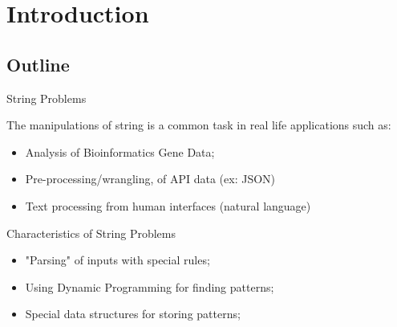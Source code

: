 \section{Introduction}

\subsection{Outline}

\begin{frame}{String Problems}
    \begin{exampleblock}{}
      The manipulations of string is a common task in real life applications such as:

      \begin{itemize}
        \item Analysis of Bioinformatics Gene Data;
        \item Pre-processing/wrangling, of API data (ex: JSON)
        \item Text processing from human interfaces (natural language)
      \end{itemize}
    \end{exampleblock}

    \begin{block}{Characteristics of String Problems}
      \begin{itemize}
      \item "Parsing" of inputs with special rules;
      \item Using Dynamic Programming for finding patterns;
      \item Special data structures for storing patterns;
      \end{itemize}
    \end{block}
\end{frame}

